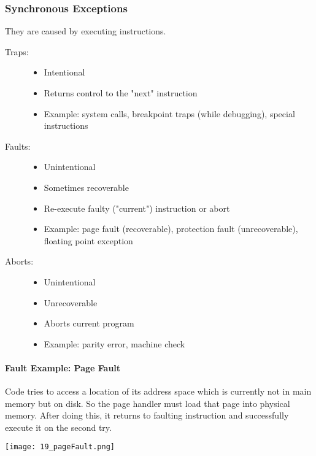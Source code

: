 \subsubsection{Synchronous Exceptions}
They are caused by executing instructions.

\begin{description}
    \item[Traps:] 
        \begin{itemize}
            \item Intentional
            \item Returns control to the "next" instruction
            \item Example: system calls, breakpoint traps (while debugging), special instructions
        \end{itemize}
    \item[Faults:]
        \begin{itemize}
            \item Unintentional
            \item Sometimes recoverable
            \item Re-execute faulty ("current") instruction or abort
            \item Example: page fault (recoverable), protection fault (unrecoverable), floating point exception
        \end{itemize}
    \item[Aborts:]
        \begin{itemize}
            \item Unintentional
            \item Unrecoverable
            \item Aborts current program
            \item Example: parity error, machine check
        \end{itemize}
\end{description}

\paragraph{Fault Example: Page Fault}
Code tries to access a location of its address space which is currently not in main memory but on disk. So the page handler must load that page into physical memory. After doing this, it returns to faulting instruction and successfully execute it on the second try.

\texttt{[image: 19\_pageFault.png]}

